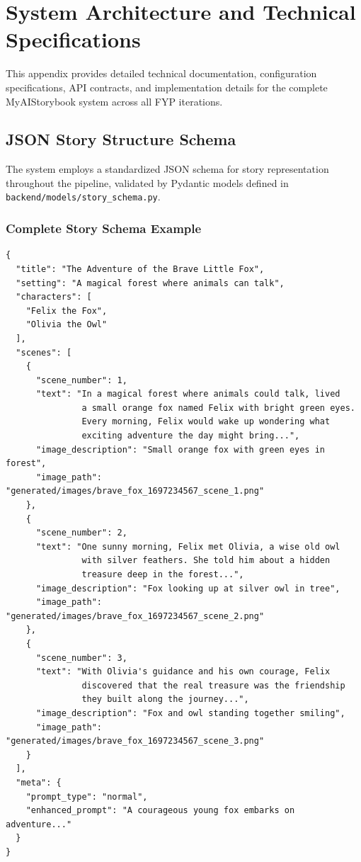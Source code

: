 \chapter{System Architecture and Technical Specifications}
\label{appendix:technical-specs}

This appendix provides detailed technical documentation, configuration specifications, API contracts, and implementation details for the complete MyAIStorybook system across all FYP iterations.

\section{JSON Story Structure Schema}
The system employs a standardized JSON schema for story representation throughout the pipeline, validated by Pydantic models defined in \texttt{backend/models/story\_schema.py}.

\subsection{Complete Story Schema Example}
\begin{verbatim}
{
  "title": "The Adventure of the Brave Little Fox",
  "setting": "A magical forest where animals can talk",
  "characters": [
    "Felix the Fox",
    "Olivia the Owl"
  ],
  "scenes": [
    {
      "scene_number": 1,
      "text": "In a magical forest where animals could talk, lived
               a small orange fox named Felix with bright green eyes.
               Every morning, Felix would wake up wondering what
               exciting adventure the day might bring...",
      "image_description": "Small orange fox with green eyes in forest",
      "image_path": "generated/images/brave_fox_1697234567_scene_1.png"
    },
    {
      "scene_number": 2,
      "text": "One sunny morning, Felix met Olivia, a wise old owl
               with silver feathers. She told him about a hidden
               treasure deep in the forest...",
      "image_description": "Fox looking up at silver owl in tree",
      "image_path": "generated/images/brave_fox_1697234567_scene_2.png"
    },
    {
      "scene_number": 3,
      "text": "With Olivia's guidance and his own courage, Felix
               discovered that the real treasure was the friendship
               they built along the journey...",
      "image_description": "Fox and owl standing together smiling",
      "image_path": "generated/images/brave_fox_1697234567_scene_3.png"
    }
  ],
  "meta": {
    "prompt_type": "normal",
    "enhanced_prompt": "A courageous young fox embarks on adventure..."
  }
}
\end{verbatim}

